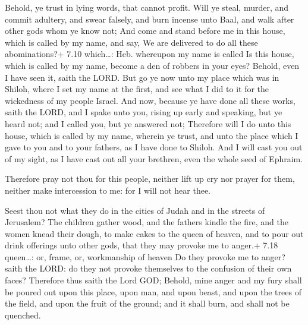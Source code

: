  Behold, ye trust in lying words, that cannot profit.
 Will ye steal, murder, and commit adultery, and swear
falsely, and burn incense unto Baal, and walk after other gods whom ye
know not;  And come and stand before me in this house,
which is called by my name, and say, We are delivered to do all these
abominations?+ 7.10 which\ldots: Heb. whereupon my name is called
 Is this house, which is called by my name, become a den of
robbers in your eyes? Behold, even I have seen it, saith the LORD.
 But go ye now unto my place which was in Shiloh, where I
set my name at the first, and see what I did to it for the wickedness of
my people Israel.  And now, because ye have done all these
works, saith the LORD, and I spake unto you, rising up early and
speaking, but ye heard not; and I called you, but ye answered not;
 Therefore will I do unto this house, which is called by my
name, wherein ye trust, and unto the place which I gave to you and to
your fathers, as I have done to Shiloh.  And I will cast
you out of my sight, as I have cast out all your brethren, even the
whole seed of Ephraim.

 Therefore pray not thou for this people, neither lift up
cry nor prayer for them, neither make intercession to me: for I will not
hear thee.

 Seest thou not what they do in the cities of Judah and
in the streets of Jerusalem?  The children gather wood, and
the fathers kindle the fire, and the women knead their dough, to make
cakes to the queen of heaven, and to pour out drink offerings unto other
gods, that they may provoke me to anger.+ 7.18 queen\ldots: or, frame,
or, workmanship of heaven  Do they provoke me to anger?
saith the LORD: do they not provoke themselves to the confusion of their
own faces?  Therefore thus saith the Lord GOD; Behold, mine
anger and my fury shall be poured out upon this place, upon man, and
upon beast, and upon the trees of the field, and upon the fruit of the
ground; and it shall burn, and shall not be quenched.

